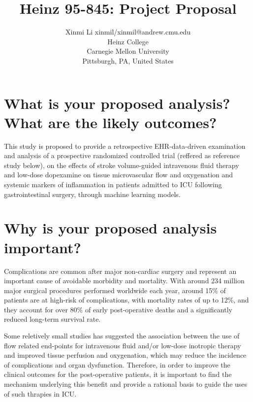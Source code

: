 \documentclass[twoside,10.5pt]{article}
\begin{document}
\title{Heinz 95-845: Project Proposal}

\author{\name Xinmi Li \email xinmil/xinmil@andrew.cmu.edu \\
       \addr Heinz College\\
       Carnegie Mellon University\\
       Pittsburgh, PA, United States} 

\maketitle

\section{What is your proposed analysis? What are the likely outcomes?}

This study is proposed to provide a retrospective EHR-data-driven examination and analysis of a prospective randomized controlled trial (reffered as reference study below), on the effects of stroke volume-guided intravenous fluid therapy and low-dose dopexamine on tissue microvascular flow and oxygenation and systemic markers of inflammation in patients admitted to ICU following gastrointestinal surgery, through machine learning models.

\section{Why is your proposed analysis important?}

Complications are common after major non-cardiac surgery and represent an important cause of avoidable morbidity and mortality. With around 234 million major surgical procedures performed worldwide each year, around 15\% of patients are at high-risk of complications, with mortality rates of up to 12\%, and they account for over 80\% of early post-operative deaths and a significantly reduced long-term survival rate.

Some reletively small studies has suggested the association between the use of flow related end-points for intravenous fluid and/or low-dose inotropic therapy and improved tissue perfusion and oxygenation, which may reduce the incidence of complications and organ dysfunction. Therefore, in order to improve the clinical outcomes for the post-operative patients, it is important to find the mechanism underlying this benefit and provide a rational basis to guide the uses of such thrapies in ICU.
\end{document}
